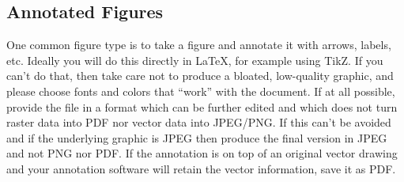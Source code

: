 \subsection{Annotated Figures}
\label{sec:annotate}

One common figure type is to take a figure and annotate it with
arrows, labels, etc.
Ideally you will do this directly in \LaTeX{}, for example using TikZ.
If you can't do that, then take care not to produce a bloated,
low-quality graphic, and please choose fonts and colors that ``work''
with the document.
If at all possible, provide the file in a format which can be further
edited and which does not turn raster data into PDF nor vector data
into JPEG/PNG.
If this can't be avoided and if the underlying graphic is JPEG then
produce the final version in JPEG and not PNG nor PDF.
If the annotation is on top of an original vector drawing and your
annotation software will retain the vector information, save it as
PDF.

